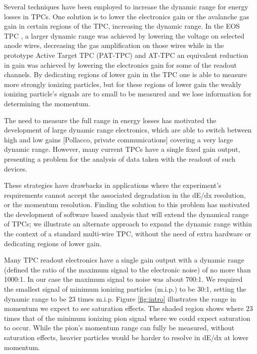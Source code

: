 \documentclass[review]{elsarticle}
\begin{document}
 Several techniques have been employed to increase the dynamic range for energy losses in TPCs. One solution is to lower the electronics gain or the avalanche gas gain in certain regions of the TPC, increasing the dynamic range. In the EOS TPC \cite{eos}, a larger dynamic range was achieved by lowering the voltage on selected anode wires, decreasing the gas amplification on those wires while in the prototype Active Target TPC (PAT-TPC) and AT-TPC an equivalent reduction in gain was achieved by lowering the electronics gain for some of the readout channels.  By dedicating regions of lower gain in the TPC one is able to measure more strongly ionizing particles, but for these regions of lower gain the weakly ionizing particle's signals are to small to be measured and we lose information for determining the momentum. 
 
 The need to measure the full range in energy losses has motivated the development of large dynamic range electronics, which are able to switch between high and low gains [Pollacco, private communications] covering a very large dynamic range. However, many current TPCs have a single fixed gain output, presenting a problem for the analysis of data taken with the readout of such devices.

 These strategies have drawbacks in applications where the experiment's requirements cannot accept the associated degradation in the dE/dx resolution, or the momentum resolution. Finding the solution to this problem has motivated the development of software based analysis that will extend the dynamical range of TPCs; we illustrate an alternate approach to expand the dynamic range within the context of a standard multi-wire TPC, without the need of extra hardware or dedicating regions of lower gain. 
 
 Many TPC readout electronics have a single gain output with a dynamic range (defined the ratio of the maximum signal to the electronic noise) of no more than 1000:1. In our case the maximum signal to noise was about 700:1. We required the smallest signal of minimum ionizing particles (m.i.p.) to be 30:1, setting the dynamic range to be 23 times m.i.p. Figure \ref{fig:intro} illustrates the range in momentum we expect to see saturation effects. The shaded region shows where 23 times that of the minimum ionizing pion signal where we could expect saturation to occur. While the pion's momentum range can fully be measured, without saturation effects, heavier particles would be harder to resolve in dE/dx at lower momentum.
\end{document}
